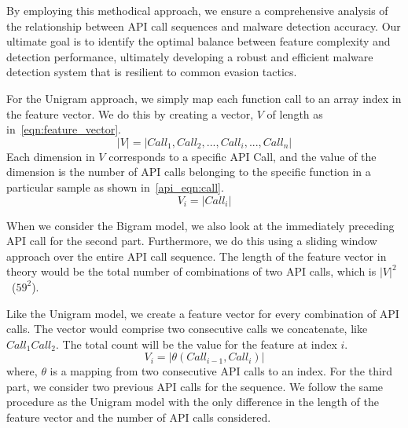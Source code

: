 By employing this methodical approach, we ensure a comprehensive analysis of the relationship between API call sequences and malware detection accuracy. Our ultimate goal is to identify the optimal balance between feature complexity and detection performance, ultimately developing a robust and efficient malware detection system that is resilient to common evasion tactics.

For the Unigram approach, we simply map each function call to an array index in the feature vector.
We do this by creating a vector, $V$ of length as in~\autoref{eqn:feature_vector}.
\begin{equation}
    |V| = |{Call_1, Call_2, ..., Call_i, ..., Call_n}|
    \label{eqn:feature_vector}
\end{equation}
Each dimension in $V$ corresponds to a specific API Call, and the value of the dimension is the number of API calls belonging to the specific function in a particular sample as shown in~\autoref{api_eqn:call}.
\begin{equation}
    V_i = |Call_i| 
    \label{api_eqn:call}
\end{equation}

When we consider the Bigram model, we also look at the immediately preceding API call for the second part. 
Furthermore, we do this using a sliding window approach over the entire API call sequence.
The length of the feature vector in theory would be the total number of combinations of two API calls, which is $|V|^2$~($59^2$).

Like the Unigram model, we create a feature vector for every combination of API calls.
The vector would comprise two consecutive calls we concatenate, like $Call_1Call_2$.
The total count will be the value for the feature at index $i$.
\begin{equation}
    V_i = |\theta(Call_{i-1},Call_{i})|
\end{equation}
where,
$\theta$ is a mapping from two consecutive API calls to an index.
For the third part, we consider two previous API calls for the sequence. 
We follow the same procedure as the Unigram model with the only difference in the length of the feature vector and the number of API calls considered.

